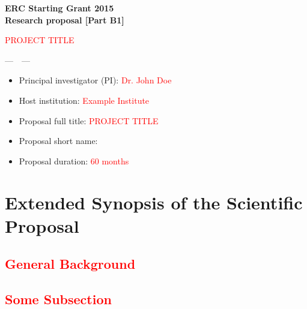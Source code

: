 
\addtocounter{chapter}{1}




\vspace*{1cm}

\begin{center}
\LARGE{\textbf{ERC Starting Grant 2015\\
Research proposal [Part B1] }
}
\vfill

\LARGE{\textsc{\textcolor{red}{PROJECT TITLE}}}

\vfill

\LARGE{\textsc{---~\acro~---}}

\vfill

\end{center}

\vfill

\begin{itemize}
\item Principal investigator (PI): \textcolor{red}{Dr. John Doe}
\item Host institution: \textcolor{red}{Example Institute}
\item{Proposal full title: \textcolor{red}{PROJECT TITLE}}
\item Proposal short name: \acro
\item Proposal duration: \textcolor{red}{60 months}
\end{itemize}
	

\vfill

\noindent
{}
\vfill


\newpage
\section{Extended Synopsis of the Scientific Proposal}

\subsection*{\textcolor{red}{General Background}}

\textcolor{red}{\blindtext[2]}


\subsection*{\textcolor{red}{Some Subsection}}

